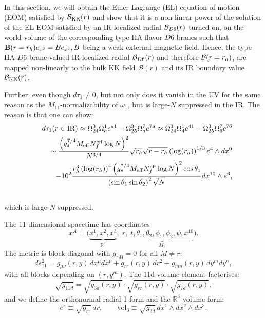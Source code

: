 \documentclass[a4paper,11pt,fleqn]{article}
\theoremstyle{plain}
\theoremstyle{definition}
\newcommand{\vthree}{\mathrm{vol}_3}
\newcommand{\er}{e^r}
\newcommand{\gone}{g_{11d}}
\newcommand{\gthree}{g_{3d}}
\newcommand{\gseven}{g_{7d}}
\newcommand{\grr}{g_{rr}}
\begin{document}
In this section, we will obtain the Euler-Lagrange (EL) equation of motion (EOM) satisfied by ${\cal B}_{\rm KK}(r)$ and show that it is a non-linear power of the solution of the EL EOM satisfied by an IR-localized radial ${\cal B}_{D6}(r)$ turned on, on the world-volume of the corresponding type IIA flavor $D6$-branes such that ${\bf B}(r=r_h) e_{x^3} = B e_{x^3}, B$ being a weak external magnetic field. Hence, the type IIA $D6$-brane-valued IR-localized radial ${\cal B}_{D6}(r)$ and therefore ${\cal B}(r=r_h)$, are mapped non-linearly to the bulk KK field $\mathcal{B}(r)$ and its IR boundary value ${\cal B}_{\rm KK}(r)$.

Further, even though $d\tau_1\neq0$, but not only does it vanish in the UV for the same reason as the $M_{11}$-normalizability of $\omega_1$, but is large-$N$ suppressed in the IR. The reason is that one can show:
\begin{eqnarray}
\label{dtau1-1}
& & d\tau_1(r\in{\rm IR})\approx \Omega^3_{24}\Omega^1_a e^{a1} - \Omega^3_{25}\Omega^7_a e^{7a}\approx \Omega^3_{24}\Omega^1_4e^{41} - \Omega^3_{25}\Omega^7_6e^{76}\nonumber\\
& & \sim\frac{\left(g_s^{7/4}M_{\rm eff}N_f^{\rm eff}\log N\right)^2}{N^{3/4}}\sqrt{r_h}\sqrt{r - r_h}\left(\log  (r_h) \right)^{1/3} e^4\wedge dx^0 \nonumber\\ 
& & - 10^2\frac{r_h^3\left(\log  (r_h) \right)^{4}\left(g_s^{7/4}M_{\rm eff}N_f^{\rm eff}\log N\right)^2\cos\theta_1}{\left(\sin\theta_{1}\sin\theta_{2}\right)^2\sqrt{N}}dx^{10}\wedge e^6,\nonumber\\
& & 
\end{eqnarray}
which is large-$N$ suppressed.


The 11-dimensional spacetime has coordinates
\[
  x^A = \bigl(
    \underbrace{x^1,x^2,x^3}_{\mathbb{R}^3},\;
    r,\;
    \underbrace{t, \theta_1, \theta_2, \phi_1, \phi_2, \psi, x^{10}}_{M_7}
  \bigr).
\]
The metric is block-diagonal with $g_{rM}=0$ for all $M\neq r$:
\begin{equation}
  ds^2_{11}
  = g_{\mu\nu}(r,y)\,dx^\mu dx^\nu
  + \grr(r,y)\,dr^2
  + g_{mn}(r,y)\,dy^m dy^n,
\label{eq:metric}
\end{equation}
with all blocks depending on $(r,y^m)$.  The 11d volume element factorises:
\[
  \sqrt{\gone}
  = \sqrt{\gthree(r,y)}\cdot\sqrt{\grr(r,y)}\cdot\sqrt{\gseven(r,y)},
\]
and we define the orthonormal radial 1-form and the $\mathbb{R}^3$ volume form:
\[
  \er \equiv \sqrt{\grr}\,dr,
  \qquad
  \vthree \equiv \sqrt{\gthree}\,dx^1\wedge dx^2\wedge dx^3.
\]
\end{document}
